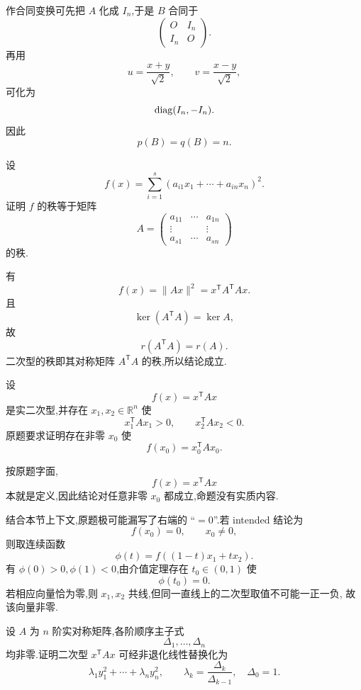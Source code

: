 \begin{solution}
作合同变换可先把 $A$ 化成 $I_n$,于是 $B$ 合同于
\[
\begin{pmatrix}
O&I_n\\
I_n&O
\end{pmatrix}.
\]
再用
\[
u=\dfrac{x+y}{\sqrt2},
\qquad
v=\dfrac{x-y}{\sqrt2},
\]
可化为
\[
\operatorname{diag}(I_n,-I_n).
\]
因此
\[
\boxed{p(B)=q(B)=n}.
\]
\end{solution}


\begin{example}
设
\[
f(x)=
\sum\limits_{i=1}^{s}
(a_{i1}x_1+\cdots+a_{in}x_n)^2.
\]
证明 $f$ 的秩等于矩阵
\[
A=
\begin{pmatrix}
a_{11}&\cdots&a_{1n}\\
\vdots&&\vdots\\
a_{s1}&\cdots&a_{sn}
\end{pmatrix}
\]
的秩.
\end{example}
\exampleblank

\begin{solution}
有
\[
f(x)=\|Ax\|^2=x^{\mathsf T}A^{\mathsf T}Ax.
\]
且
\[
\ker(A^{\mathsf T}A)=\ker A,
\]
故
\[
r(A^{\mathsf T}A)=r(A).
\]
二次型的秩即其对称矩阵 $A^{\mathsf T}A$ 的秩,所以结论成立.
\end{solution}


\begin{example}
设
\[
f(x)=x^{\mathsf T}Ax
\]
是实二次型,并存在 $x_1,x_2\in\mathbb{R}^n$ 使
\[
x_1^{\mathsf T}Ax_1>0,
\qquad
x_2^{\mathsf T}Ax_2<0.
\]
原题要求证明存在非零 $x_0$ 使
\[
f(x_0)=x_0^{\mathsf T}Ax_0.
\]
\end{example}
\exampleblank

\begin{solution}
按原题字面,
\[
f(x)=x^{\mathsf T}Ax
\]
本就是定义,因此结论对任意非零 $x_0$ 都成立,命题没有实质内容.

结合本节上下文,原题极可能漏写了右端的 ``$=0$''.若 intended 结论为
\[
f(x_0)=0,\qquad x_0\neq0,
\]
则取连续函数
\[
\phi(t)=f((1-t)x_1+tx_2).
\]
有 $\phi(0)>0,\phi(1)<0$,由介值定理存在 $t_0\in(0,1)$ 使
\[
\phi(t_0)=0.
\]
若相应向量恰为零,则 $x_1,x_2$ 共线,但同一直线上的二次型取值不可能一正一负,
故该向量非零.
\end{solution}


\begin{example}
设 $A$ 为 $n$ 阶实对称矩阵,各阶顺序主子式
\[
\Delta_1,\ldots,\Delta_n
\]
均非零.证明二次型 $x^{\mathsf T}Ax$ 可经非退化线性替换化为
\[
\lambda_1y_1^2+\cdots+\lambda_ny_n^2,
\qquad
\lambda_k=\dfrac{\Delta_k}{\Delta_{k-1}},
\quad
\Delta_0=1.
\]
\end{example}
\exampleblank

